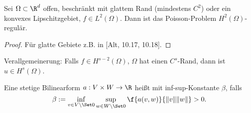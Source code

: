 \begin{st} \label{3.30}
	Sei $\Omega \subset \R^d$ offen, beschränkt mit glattem Rand (mindestens $C^2$) oder ein konvexes Lipschitzgebiet, $f \in L^2(\Omega)$.
	Dann ist das Poisson-Problem $H^2(\Omega)$-regulär.
	\begin{proof}
		Für glatte Gebiete z.B. in [Alt, 10.17, 10.18].
	\end{proof}
	\begin{note}
		Verallgemeinerung:
		Falls $f \in H^{s-2}(\Omega)$, $\Omega$ hat einen $C^s$-Rand, dann ist $u \in H^s(\Omega)$.
	\end{note}
\end{st}

\begin{df} \label{3.31}
	Eine stetige Bilinearform $a: V \times W \to \R$ heißt  mit inf-sup-Konstante $\beta$, falls
	\[
		\beta := \inf_{v \in V \setminus \Set 0} \sup_{w \in W \setminus \Set 0} \f{a(v,w)}{\|v\|\|w\|} > 0.
	\]
\end{df}

